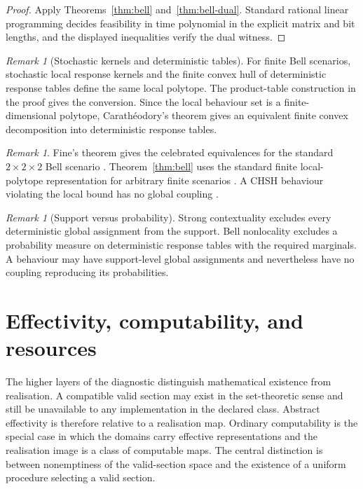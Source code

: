 \documentclass[11pt]{article}
\theoremstyle{plain}
\theoremstyle{definition}
\theoremstyle{remark}
\newtheorem{remark}[theorem]{Remark}
\begin{document}
\begin{proof}
Apply Theorems~\ref{thm:bell} and~\ref{thm:bell-dual}. Standard rational linear
programming decides feasibility in time polynomial in the explicit matrix and
bit lengths, and the displayed inequalities verify the dual witness.
\end{proof}

\begin{remark}[Stochastic kernels and deterministic tables]
For finite Bell scenarios, stochastic local response kernels and the finite
convex hull of deterministic response tables define the same local polytope. The
product-table construction in the proof gives the conversion. Since the local
behaviour set is a finite-dimensional polytope, Carath\'eodory's theorem gives
an equivalent finite convex decomposition into deterministic response tables.
\end{remark}

\begin{remark}
Fine's theorem gives the celebrated equivalences for the standard
$2\times2\times2$ Bell scenario \cite{fine}. Theorem~\ref{thm:bell} uses the
standard finite local-polytope representation for arbitrary finite scenarios
\cite{pitowsky}. A CHSH behaviour violating the local bound has no global coupling
\cite{chsh}.
\end{remark}

\begin{remark}[Support versus probability]
Strong contextuality excludes every deterministic global assignment from the
support. Bell nonlocality excludes a probability measure on deterministic
response tables with the required marginals. A behaviour may have support-level
global assignments and nevertheless have no coupling reproducing its
probabilities.
\end{remark}

\section{Effectivity, computability, and resources}\label{sec:effect}

The higher layers of the diagnostic distinguish mathematical existence from
realisation. A compatible valid section may exist in the set-theoretic sense and
still be unavailable to any implementation in the declared class. Abstract
effectivity is therefore relative to a realisation map. Ordinary computability is
the special case in which the domains carry effective representations and the
realisation image is a class of computable maps. The central distinction is
between nonemptiness of the valid-section space and the existence of a uniform
procedure selecting a valid section.
\end{document}
